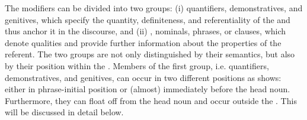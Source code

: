 The modifiers can be divided into two groups: (i) quantifiers, demonstratives, and genitives, which specify the quantity, definiteness, and referentiality of the  and thus anchor it in the discourse, and (ii) , nominals, phrases, or clauses, which denote qualities and provide further information about the properties of the referent. The two groups are not only distinguished by their semantics, but also by their position within the . Members of the first group, i.e. quantifiers, demonstratives, and genitives, can occur in two different positions as  shows: either in phrase-initial position or (almost) immediately before the head noun. Furthermore, they can float off from the head noun and occur outside the . This will be discussed in detail below.

